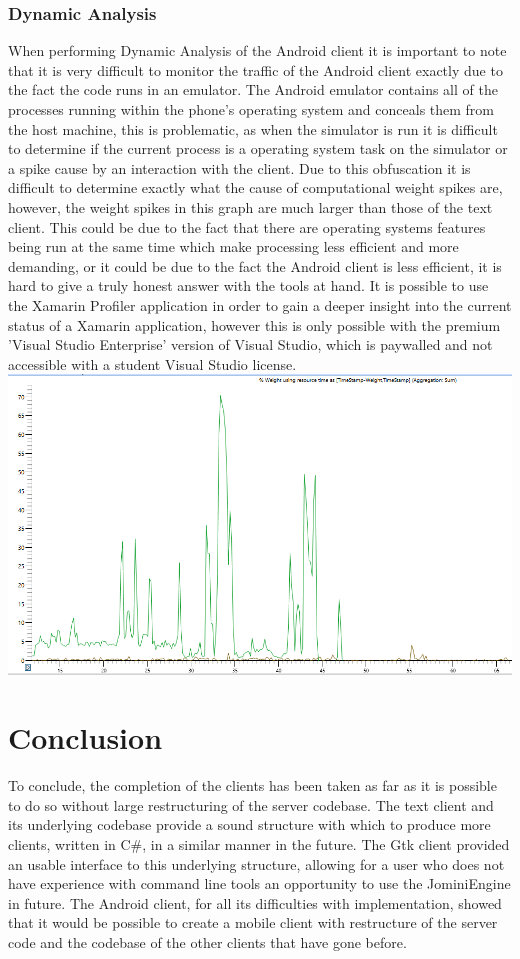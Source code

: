 \documentclass{article}
\begin{document}
\subsubsection{Dynamic Analysis}
When performing Dynamic Analysis of the Android client it is important to note that it is very difficult to monitor the traffic of the Android client exactly due to the fact the code runs in an emulator. The Android emulator contains all of the processes running within the phone's operating system and conceals them from the host machine, this is problematic, as when the simulator is run it is difficult to determine if the current process is a operating system task on the simulator or a spike cause by an interaction with the client. Due to this obfuscation it is difficult to determine exactly what the cause of computational weight spikes are, however, the weight spikes in this graph are much larger than those of the text client. This could be due to the fact that there are operating systems features being run at the same time which make processing less efficient and more demanding, or it could be due to the fact the Android client is less efficient, it is hard to give a truly honest answer with the tools at hand. It is possible to use the Xamarin Profiler application in order to gain a deeper insight into the current status of a Xamarin application, however this is only possible with the premium 'Visual Studio Enterprise' version of Visual Studio, which is paywalled and not accessible with a student Visual Studio license.
\includegraphics[width=\textwidth]{androidgraph.PNG}
\section{Conclusion}
To conclude, the completion of the clients has been taken as far as it is possible to do so without large restructuring of the server codebase. The text client and its underlying codebase provide a sound structure with which to produce more clients, written in C\#, in a similar manner in the future. The Gtk client provided an usable interface to this underlying structure, allowing for a user who does not have experience with command line tools an opportunity to use the JominiEngine in future. The Android client, for all its difficulties with implementation, showed that it would be possible to create a mobile client with restructure of the server code and the codebase of the other clients that have gone before.
\end{document}
